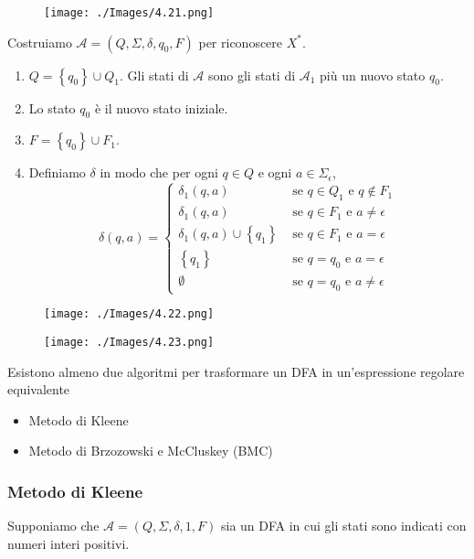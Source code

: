 \begin{figure}[hbpt!]
    \centering
    \texttt{[image: ./Images/4.21.png]}
\end{figure}
\FloatBarrier

Costruiamo $\mathcal{A}=\left(Q, \Sigma, \delta, q_{0}, F\right)$ per riconoscere $X^{*}$.
\begin{enumerate}
    \item $Q=\left\{q_{0}\right\} \cup Q_{1}$.
Gli stati di $\mathcal{A}$ sono gli stati di $\mathcal{A}_{1}$ più un nuovo stato $q_{0}$.
    \item Lo stato $q_{0}$ è il nuovo stato iniziale.
    \item  $F=\left\{q_{0}\right\} \cup F_{1}$.
    \item  Definiamo $\delta$ in modo che per ogni $q \in Q$ e ogni $a \in \Sigma_{\epsilon}$,
$$
\delta(q, a)= \begin{cases}\delta_{1}(q, a) & \text { se } q \in Q_{1} \text { e } q \notin F_{1} \\ \delta_{1}(q, a) & \text { se } q \in F_{1} \text { e } a \neq \epsilon \\ \delta_{1}(q, a) \cup\left\{q_{1}\right\} & \text { se } q \in F_{1} \text { e } a=\epsilon \\ \left\{q_{1}\right\} & \text { se } q=q_{0} \text { e } a=\epsilon \\ \emptyset & \text { se } q=q_{0} \text { e } a \neq \epsilon\end{cases}
$$
\end{enumerate}

\begin{figure}[hbpt!]
    \centering
    \texttt{[image: ./Images/4.22.png]}
\end{figure}
\FloatBarrier

\begin{figure}[hbpt!]
    \centering
    \texttt{[image: ./Images/4.23.png]}
\end{figure}
\FloatBarrier

Esistono almeno due algoritmi per trasformare un DFA in
un'espressione regolare equivalente
\begin{itemize}
    \item Metodo di Kleene
    \item Metodo di Brzozowski e McCluskey (BMC)
\end{itemize}

\subsubsection{Metodo di Kleene}
Supponiamo che $\mathcal{A}=(Q, \Sigma, \delta, 1, F)$ sia un DFA in cui gli stati sono indicati con numeri interi positivi.


